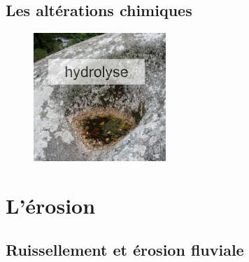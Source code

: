 \documentclass{beamer}
\begin{document}
\subsection{Les altérations chimiques}
\begin{frame}
  \begin{center}
    \begin{figure}
      \includegraphics[width=5cm]{Images/Diapos/Alteration/Chimiques/hydrolyse.jpeg}
    \end{figure}
  \end{center}
\end{frame}

\section{L'érosion}

\subsection{Ruissellement et érosion fluviale}
\begin{frame}
 \begin{center}
  \begin{figure}
  \end{figure}
 \end{center}
\end{frame}
\end{document}
